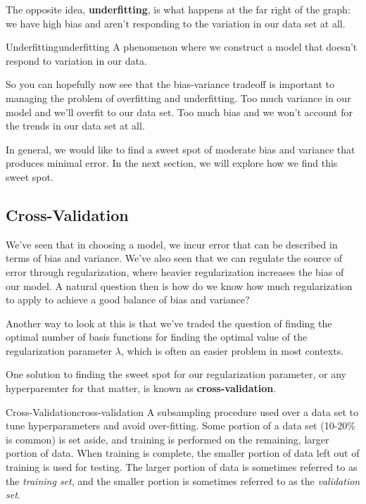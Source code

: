 The opposite idea, \textbf{underfitting}, is what happens at the far right of the graph: we have high bias and aren't responding to the variation in our data set at all.

\begin{definition}{Underfitting}{underfitting}
    A phenomenon where we construct a model that doesn't respond to variation in our data.
\end{definition}

So you can hopefully now see that the bias-variance tradeoff is important to managing the problem of overfitting and underfitting. Too much variance in our model and we'll overfit to our data set. Too much bias and we won't account for the trends in our data set at all.

In general, we would like to find a sweet spot of moderate bias and variance that produces minimal error. In the next section, we will explore how we find this sweet spot.

\subsection{Cross-Validation}
We've seen that in choosing a model, we incur error that can be described in terms of bias and variance. We've also seen that we can regulate the source of error through regularization, where heavier regularization increases the bias of our model. A natural question then is how do we know how much regularization to apply to achieve a good balance of bias and variance?

Another way to look at this is that we've traded the question of finding the optimal number of basis functions for finding the optimal value of the regularization parameter $\lambda$, which is often an easier problem in most contexts.

One solution to finding the sweet spot for our regularization parameter, or any hyperparemter for that matter, is known as \textbf{cross-validation}.

\begin{definition}{Cross-Validation}{cross-validation}
    A subsampling procedure used over a data set to tune hyperparameters and avoid over-fitting. Some portion of a data set (10-20\% is common) is set aside, and training is performed on the remaining, larger portion of data. When training is complete, the smaller portion of data left out of training is used for testing. The larger portion of data is sometimes referred to as the \textit{training set}, and the smaller portion is sometimes referred to as the \textit{validation set}.
\end{definition}

